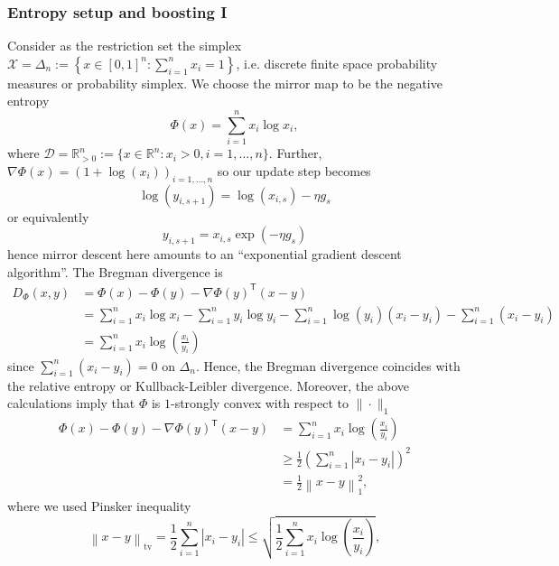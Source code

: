 \subsubsection{Entropy setup and boosting I}
Consider  as the restriction set the simplex $\mathcal{X} = \Delta_n := \left\{x\in [0,1]^n: \sum_{i=1}^n x_i = 1\right\}$, i.e. discrete finite space probability measures or probability simplex. We choose the mirror map to be the negative entropy
\begin{equation*}
	\Phi(x) = \sum_{i=1}^n x_i \log x_i,
\end{equation*}
where $\mathcal{D} = \mathbb{R}^n_{>0} := \{x \in \mathbb{R}^n \colon x_i > 0, i=1,\ldots,n \}$. Further, $\nabla \Phi(x) = \left(1 + \log(x_i)\right)_{i=1,\ldots,n}$ so our update step becomes
\begin{equation*}
	\log(y_{i, s+1}) = \log(x_{i, s}) - \eta g_s
\end{equation*}
or equivalently
\begin{equation*}
	y_{i, s+1} = x_{i, s}\exp\left(-\eta g_s \right)
\end{equation*}
hence mirror descent here amounts to an "`exponential gradient descent algorithm"'. The Bregman divergence is
\begin{align*}
	D_\Phi(x, y) &= \Phi(x) - \Phi(y) - \nabla \Phi(y)^\mathsf{T}(x - y) \\
	& = \sum_{i=1}^n x_i \log x_i - \sum_{i=1}^n y_i \log y_i - \sum_{i=1}^n \log(y_i) (x_i - y_i) - \sum_{i=1}^n (x_i - y_i)	\\
	& = \sum_{i=1}^n x_i \log\left( \frac{x_i}{y_i} \right)
\end{align*}
since $\sum_{i=1}^n (x_i - y_i) = 0$ on $\Delta_n$. Hence, the Bregman divergence coincides with the relative entropy or Kullback-Leibler divergence. Moreover, the above calculations imply that $\Phi$ is $1$-strongly convex with respect to $\|\cdot\|_1$
\begin{align*}
	\Phi(x) - \Phi(y) - \nabla \Phi(y)^\mathsf{T}(x - y) & = \sum_{i=1}^n x_i \log\left( \frac{x_i}{y_i} \right) \\
	& \geq \frac{1}{2}\left(\sum_{i=1}^n|x_i - y_i|\right)^2 \\
	& = \frac{1}{2}\left\|x - y\right\|_1^2,
\end{align*}
where we used Pinsker inequality
\begin{equation*}
	\left\| x - y \right\|_\mathrm{tv} = \frac{1}{2}\sum_{i=1}^n|x_i - y_i| \leq \sqrt{\frac{1}{2} \sum_{i=1}^n x_i \log\left( \frac{x_i}{y_i} \right)},
\end{equation*}
